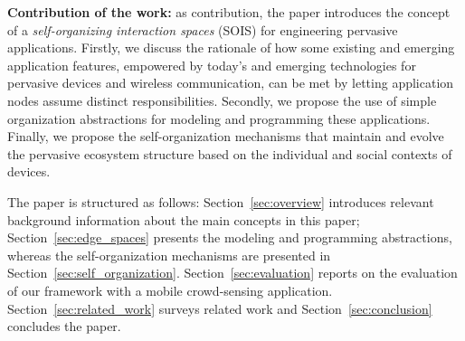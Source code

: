 \textbf{Contribution of the work:} 
as contribution, the paper introduces the concept of a \textit{self-organizing interaction spaces} (SOIS) 
for engineering pervasive applications. 
Firstly, we discuss the rationale of how some existing and emerging application features, empowered by today's and emerging technologies for pervasive devices and wireless communication, 
can be met by letting application nodes assume distinct responsibilities. 
Secondly, we propose the use of simple organization abstractions for modeling and programming these applications. Finally, we propose the self-organization mechanisms that maintain and evolve the pervasive ecosystem structure based on the individual and social contexts of devices.



The paper is structured as follows: Section~\ref{sec:overview} introduces relevant background information about the main concepts in this paper; %
Section~\ref{sec:edge_spaces} presents the modeling and programming abstractions, whereas the self-organization mechanisms are presented in Section~\ref{sec:self_organization}. Section~\ref{sec:evaluation} reports on the evaluation of our framework with a mobile crowd-sensing application. Section~\ref{sec:related_work} surveys related work and Section~\ref{sec:conclusion} concludes the paper.